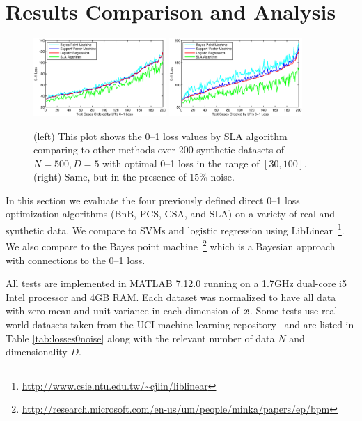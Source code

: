 \section{Results Comparison and Analysis}
\label{cha:results}

\begin{figure}[htp!]
\vspace{-1mm}
\hspace{10mm}\includegraphics[width=0.45\textwidth]{images/fig61_621a.eps}
\includegraphics[width=0.45\textwidth]{images/fig61_621b.eps}
\vspace{-2mm}
\caption{ (left) This plot shows the 0--1 loss values by SLA algorithm
  comparing to other methods over 200 synthetic datasets of $N=500,
  D=5$ with optimal 0--1 loss in the range of $[30, 100]$.  
  (right) Same, but in the presence of 15\% noise.}
\label{fig:621a}
\vspace{-2mm}
\end{figure}

In this section we evaluate the four previously defined direct 0--1
loss optimization algorithms (BnB, PCS, CSA, and SLA) on a variety of
real and synthetic data.  We compare to SVMs and logistic regression
using LibLinear~\cite{linearSVM}\footnote{
  \url{http://www.csie.ntu.edu.tw/~cjlin/liblinear}}.  We also compare
to the Bayes point machine~\cite{bpm}\footnote{
  \url{http://research.microsoft.com/en-us/um/people/minka/papers/ep/bpm}}
which is a Bayesian approach with connections to the 0--1 loss.

All tests are implemented in MATLAB 7.12.0 running on a 1.7GHz
dual-core i5 Intel processor and 4GB RAM.  Each dataset was normalized
to have all data with zero mean and unit variance in each dimension of
$\boldsymbol{x}$.  Some tests use real-world datasets taken from the UCI machine
learning repository~\cite{ucidata} and are listed in Table
\ref{tab:losses0noise} along with the relevant number of data $N$ and
dimensionality $D$.

